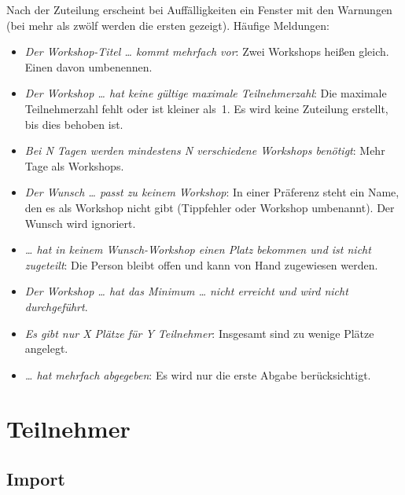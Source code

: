 \documentclass[a4paper,11pt]{article}
\begin{document}
Nach der Zuteilung erscheint bei Auffälligkeiten ein Fenster mit den Warnungen (bei mehr als zwölf werden die ersten
gezeigt). Häufige Meldungen:
\begin{itemize}
  \item \emph{Der Workshop-Titel \dots{} kommt mehrfach vor}: Zwei Workshops heißen gleich. Einen davon umbenennen.
  \item \emph{Der Workshop \dots{} hat keine gültige maximale Teilnehmerzahl}: Die maximale Teilnehmerzahl fehlt oder ist
  kleiner als~1. Es wird keine Zuteilung erstellt, bis dies behoben ist.
  \item \emph{Bei N Tagen werden mindestens N verschiedene Workshops benötigt}: Mehr Tage als Workshops.
  \item \emph{Der Wunsch \dots{} passt zu keinem Workshop}: In einer Präferenz steht ein Name, den es als Workshop nicht
  gibt (Tippfehler oder Workshop umbenannt). Der Wunsch wird ignoriert.
  \item \emph{\dots{} hat in keinem Wunsch-Workshop einen Platz bekommen und ist nicht zugeteilt}: Die Person bleibt offen
  und kann von Hand zugewiesen werden.
  \item \emph{Der Workshop \dots{} hat das Minimum \dots{} nicht erreicht und wird nicht durchgeführt}.
  \item \emph{Es gibt nur X Plätze für Y Teilnehmer}: Insgesamt sind zu wenige Plätze angelegt.
  \item \emph{\dots{} hat mehrfach abgegeben}: Es wird nur die erste Abgabe berücksichtigt.
\end{itemize}

\section{Teilnehmer}\label{sec:teilnehmer}

\subsection*{Import}
\end{document}

